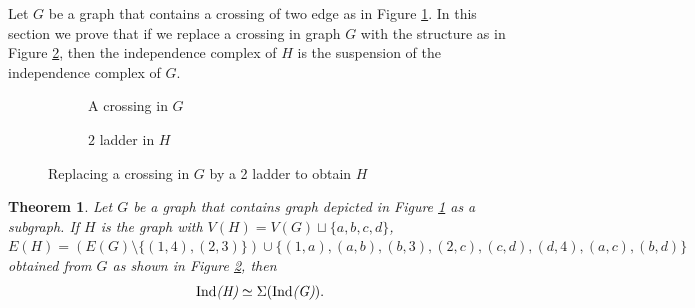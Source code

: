 \documentclass[12pt]{article}
\newtheorem{thm}{Theorem}
\numberwithin{thm}{section}
\theoremstyle{definition}
\newcommand{\ind}{{\rm{Ind}}}
\begin{document}
Let $G$ be a graph that contains a crossing of two edge as in Figure \ref{crossing}. In this section we prove that if we replace  a crossing in graph $G$ with the structure as in Figure \ref{ladder}, then the independence complex of  $H$ is the suspension of the independence complex of $G$. 

\begin{figure}[H]
	\begin{subfigure}[]{0.45 \textwidth}
		\centering
		\caption{A crossing in $G$}\label{crossing}
	\end{subfigure}
	\begin{subfigure}[]{0.45 \textwidth}
		\centering
		\caption{$2$ ladder in $H$}\label{ladder}
	\end{subfigure}
	\caption{Replacing a crossing in $G$ by a 2 ladder to obtain $H$} \label{fig:subdivision}
\end{figure}

\begin{thm}\label{thm:subdivision}
	Let $G$ be a graph that contains graph depicted in Figure \ref{crossing} as a subgraph. If  $H$ is the graph with $V(H) = V(G) \sqcup \{a,b,c,d\}$, $E(H) = (E(G) \setminus \{(1,4), (2,3)\}) \cup \{(1,a), (a,b), (b,3), (2,c), (c,d), (d,4), (a,c), (b,d)\}$  obtained from $G$ as shown in Figure \ref{ladder}, then    
	$$\emph{\ind(H)}\simeq \Sigma(\emph{\ind(G)}).$$ 
\end{thm}
\end{document}
